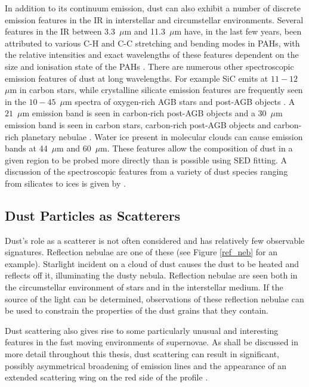 In addition to its continuum emission, dust can also exhibit a number of discrete emission features in the IR in interstellar and circumstellar environments.  Several features in the IR between 3.3~$\mu$m and 11.3~$\mu$m have, in the last few years, been attributed to various {C-H} and {C-C} stretching and bending modes in PAHs, with the relative intensities and exact wavelengths of these features dependent on the size and ionisation state of the PAHs \citep{Draine2001}.  There are numerous other spectroscopic emission features of dust at long wavelengths.  For example SiC emits at $11-12$~$\mu$m in carbon stars, while  crystalline silicate emission features are frequently seen in the $10-45$~$\mu$m spectra of oxygen-rich AGB  stars and post-AGB objects \citep{Barlow2009}.  A $21$~$\mu$m  emission band  is seen in carbon-rich post-AGB objects and a 30~$\mu$m emission band is seen in carbon stars, carbon-rich post-AGB objects and carbon-rich planetary nebulae \citep{Barlow1993}. Water ice present in molecular clouds can cause emission bands at 44~$\mu$m and $60$~$\mu$m.  These features allow the composition of dust in a given region to be probed more directly than is possible using SED fitting.  A discussion of the spectroscopic features from a variety of dust species ranging from silicates to ices is given by \citet{Draine2003}. 

\subsection{Dust Particles as Scatterers}
\label{scn:le}
Dust's role as a scatterer is not often considered and has relatively few observable signatures.  Reflection nebulae are one of these (see Figure \ref{ref_neb} for an example).  Starlight incident on a cloud of dust causes the dust to be heated and reflects off it,  illuminating the dusty nebula.  Reflection nebulae are seen both in the circumstellar environment of stars and in the interstellar medium.  If the source of the light can be determined, observations of these reflection nebulae can be used to constrain the properties of the dust grains that they contain.  

Dust scattering also gives rise to some particularly unusual and interesting features in the fast moving environments of supernovae.  As shall be discussed in more detail throughout this thesis, dust scattering can result in significant, possibly asymmetrical broadening of emission lines and the appearance of an extended scattering wing on the red side of the profile \citep{Lucy1989}. 

